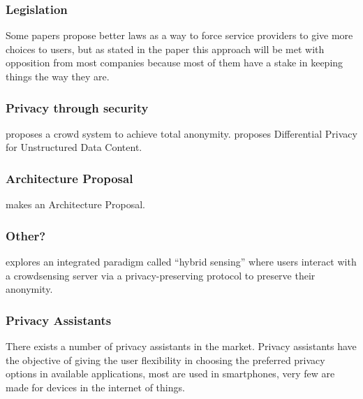 \documentclass[conference]{IEEEtran}
\begin{document}
\subsubsection{Legislation}

Some papers propose better laws \cite{} as a way to force service providers
to give more choices to users, but as stated in the paper this
approach will be met with opposition from most companies because
most of them have a stake in keeping things the way they are.

\subsubsection{Privacy through security}

\cite{SunSecure} proposes a crowd system to achieve total anonymity.
\cite{ZhaoSurvey} proposes Differential Privacy for Unstructured Data Content.

\subsubsection{Architecture Proposal}

\cite{AntunesFederated} makes an Architecture Proposal.

\subsubsection{Other?}

\cite{ZhuIntegrating} explores an integrated paradigm called ``hybrid sensing'' where users interact with a crowdsensing server via a privacy-preserving protocol to preserve their anonymity.

\subsubsection{Privacy Assistants}

There exists a number of privacy assistants in the market. Privacy assistants
have the objective of giving the user flexibility in choosing the
preferred privacy options in available applications, most are used in
smartphones, very few are made for devices in the internet of things.
\end{document}
